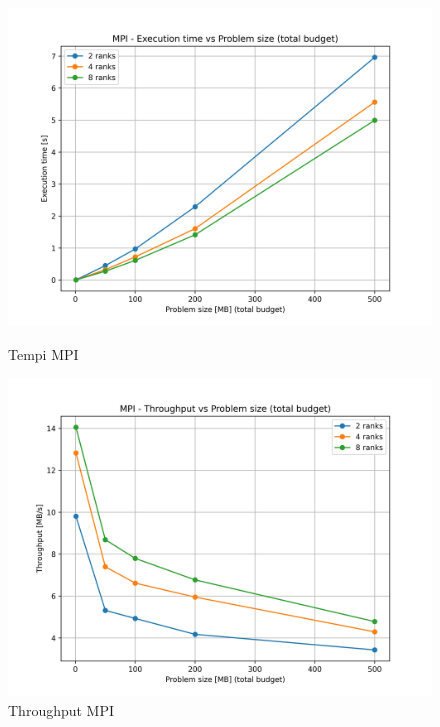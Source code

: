 			\begin{figure}[H]
				\centering
				\begin{minipage}[t]{0.49\textwidth}
					\centering
					\includegraphics[width=\textwidth]{img/mpi_plots/mpi_times.jpg}
					\caption{Tempi MPI}
					\label{fig:mpi_times}
				\end{minipage}
				\hfill
				\begin{minipage}[t]{0.49\textwidth}
					\centering
					\includegraphics[width=\textwidth]{img/mpi_plots/mpi_throughput.jpg}
					\caption{Throughput MPI}
					\label{fig:mpi_throughput}
				\end{minipage}
			\end{figure}
			
